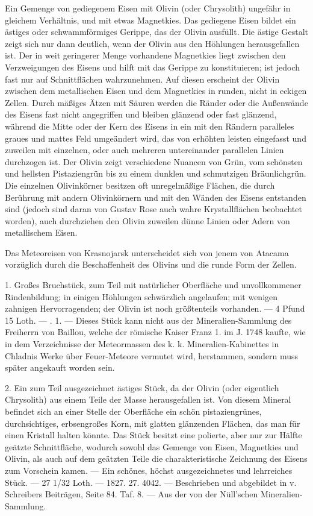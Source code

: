 \documentclass[a4paper, 11pt, oneside, polutonikogreek, german]{article}
\begin{document}
Ein Gemenge von gediegenem Eisen mit Olivin (oder Chrysolith) ungefähr in gleichem Verhältnis, und mit etwas Magnetkies. Das gediegene Eisen bildet ein ästiges oder schwammförmiges Gerippe, das der Olivin ausfüllt. Die ästige Gestalt zeigt sich nur dann deutlich, wenn der Olivin aus den Höhlungen herausgefallen ist. Der in weit geringerer Menge vorhandene Magnetkies liegt zwischen den Verzweigungen des Eisens und hilft mit das Gerippe zu konstituieren; ist jedoch fast nur auf Schnittflächen wahrzunehmen. Auf diesen erscheint der Olivin zwischen dem metallischen Eisen und dem Magnetkies in runden, nicht in eckigen Zellen. Durch mäßiges Ätzen mit Säuren werden die Ränder oder die Außenwände des Eisens fast nicht angegriffen und bleiben glänzend oder fast glänzend, während die Mitte oder der Kern des Eisens in ein mit den Rändern paralleles graues und mattes Feld umgeändert wird, das von erhöhten leisten eingefasst und zuweilen mit einzelnen, oder auch mehreren untereinander parallelen Linien durchzogen ist. Der Olivin zeigt verschiedene Nuancen von Grün, vom schönsten und hellsten Pistaziengrün bis zu einem dunklen und schmutzigen Bräunlichgrün. Die einzelnen Olivinkörner besitzen oft unregelmäßige Flächen, die durch Berührung mit andern Olivinkörnern und mit den Wänden des Eisens entstanden sind (jedoch sind daran von Gustav Rose auch wahre Krystallflächen beobachtet worden), auch durchziehen den Olivin zuweilen dünne Linien oder Adern von metallischem Eisen.

Das Meteoreisen von Krasnojarsk unterscheidet sich von jenem von Atacama vorzüglich durch die Beschaffenheit des Olivins und die runde Form der Zellen.

1. Großes Bruchstück, zum Teil mit natürlicher Oberfläche und unvollkommener Rindenbildung; in einigen Höhlungen schwärzlich angelaufen; mit wenigen zahnigen Hervorragenden; der Olivin ist noch größtenteils vorhanden. — 4 Pfund 15 Loth. — . 1. — Dieses Stück kann nicht aus der Mineralien-Sammlung des Freiherrn von Baillou, welche der römische Kaiser Franz 1. im J. 1748 kaufte, wie in dem Verzeichnisse der Meteormassen des k. k. Mineralien-Kabinettes in Chladnis Werke über Feuer-Meteore vermutet wird, herstammen, sondern muss später angekauft worden sein.

2. Ein zum Teil ausgezeichnet ästiges Stück, da der Olivin (oder eigentlich Chrysolith) aus einem Teile der Masse herausgefallen ist. Von diesem Mineral befindet sich an einer Stelle der Oberfläche ein schön pistaziengrünes, durchsichtiges, erbsengroßes Korn, mit glatten glänzenden Flächen, das man für einen Kristall halten könnte. Das Stück besitzt eine polierte, aber nur zur Hälfte geätzte Schnittfläche, wodurch sowohl das Gemenge von Eisen, Magnetkies und Olivin, als auch auf dem geätzten Teile die charakteristische Zeichnung des Eisens zum Vorschein kamen. — Ein schönes, höchst ausgezeichnetes und lehrreiches Stück. — 27 1/32 Loth. — 1827. 27. 4042. — Beschrieben und abgebildet in v. Schreibers Beiträgen, Seite 84. Taf. 8. — Aus der von der Nüll'schen Mineralien-Sammlung.
\end{document}
